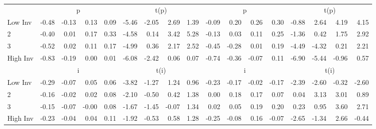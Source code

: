 \begin{table}[!ht]
\begin{tabular}{lrrrrrrrrrrrrrrrr}
  
    
      & \multicolumn{4}{c}{p} & \multicolumn{4}{c}{t(p)}
    
      & \multicolumn{4}{c}{p} & \multicolumn{4}{c}{t(p)}
    
    \\
      \cmidrule(r){2-5} \cmidrule(r){6-9} \cmidrule(r){10-13} \cmidrule(r){14-17}

    Low Inv   & -0.48  & -0.13  & 0.13  & 0.09  & -5.46  & -2.05  & 2.69  & 1.39  & -0.09  & 0.20  & 0.26  & 0.30  & -0.88  & 2.64  & 4.19  & 4.15  \\
           2  & -0.40  & 0.01  & 0.17  & 0.33  & -4.58  & 0.14  & 3.42  & 5.28  & -0.13  & 0.03  & 0.11  & 0.25  & -1.36  & 0.42  & 1.75  & 2.92  \\
           3  & -0.52  & 0.02  & 0.11  & 0.17  & -4.99  & 0.36  & 2.17  & 2.52  & -0.45  & -0.28  & 0.01  & 0.19  & -4.49  & -4.32  & 0.21  & 2.21  \\
    High Inv  & -0.83  & -0.19  & 0.00  & 0.01  & -6.08  & -2.42  & 0.06  & 0.07  & -0.74  & -0.36  & -0.07  & 0.11  & -6.90  & -5.44  & -0.96  & 0.57  \\

  
    
      & \multicolumn{4}{c}{i} & \multicolumn{4}{c}{t(i)}
    
      & \multicolumn{4}{c}{i} & \multicolumn{4}{c}{t(i)}
    
    \\
      \cmidrule(r){2-5} \cmidrule(r){6-9} \cmidrule(r){10-13} \cmidrule(r){14-17}

    Low Inv   & -0.29  & -0.07  & 0.05  & 0.06  & -3.82  & -1.27  & 1.24  & 0.96  & -0.23  & -0.17  & -0.02  & -0.17  & -2.39  & -2.60  & -0.32  & -2.60  \\
           2  & -0.16  & -0.02  & 0.02  & 0.08  & -2.10  & -0.50  & 0.42  & 1.38  & 0.00  & 0.18  & 0.17  & 0.07  & 0.04  & 3.13  & 3.01  & 0.89  \\
           3  & -0.15  & -0.07  & -0.00  & 0.08  & -1.67  & -1.45  & -0.07  & 1.34  & 0.02  & 0.05  & 0.19  & 0.20  & 0.23  & 0.95  & 3.60  & 2.71  \\
    High Inv  & -0.23  & -0.04  & 0.04  & 0.11  & -1.92  & -0.53  & 0.58  & 1.28  & -0.25  & -0.08  & 0.16  & -0.07  & -2.65  & -1.34  & 2.66  & -0.44  \\

  

  \bottomrule
\end{tabular}
\label{tbl:32_Size_BMm_Prior_F16}
\end{table}